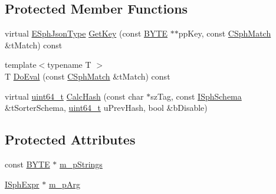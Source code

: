 \subsection*{Protected Member Functions}
\begin{DoxyCompactItemize}
\item 
virtual \hyperlink{sphinxjson_8h_ad0338b1aabded682906629a3e477a2a8}{E\-Sph\-Json\-Type} \hyperlink{structExpr__JsonFieldConv__c_ab2f14a5bce4409374b08ce107656d44e}{Get\-Key} (const \hyperlink{sphinxstd_8h_a4ae1dab0fb4b072a66584546209e7d58}{B\-Y\-T\-E} $\ast$$\ast$pp\-Key, const \hyperlink{classCSphMatch}{C\-Sph\-Match} \&t\-Match) const 
\item 
{\footnotesize template$<$typename T $>$ }\\T \hyperlink{structExpr__JsonFieldConv__c_a5c546414813f2d778b896fd8fc4fdc89}{Do\-Eval} (const \hyperlink{classCSphMatch}{C\-Sph\-Match} \&t\-Match) const 
\item 
virtual \hyperlink{sphinxstd_8h_aaa5d1cd013383c889537491c3cfd9aad}{uint64\-\_\-t} \hyperlink{structExpr__JsonFieldConv__c_a765c81cb20349ea737254ffdfb545707}{Calc\-Hash} (const char $\ast$sz\-Tag, const \hyperlink{classISphSchema}{I\-Sph\-Schema} \&t\-Sorter\-Schema, \hyperlink{sphinxstd_8h_aaa5d1cd013383c889537491c3cfd9aad}{uint64\-\_\-t} u\-Prev\-Hash, bool \&b\-Disable)
\end{DoxyCompactItemize}
\subsection*{Protected Attributes}
\begin{DoxyCompactItemize}
\item 
const \hyperlink{sphinxstd_8h_a4ae1dab0fb4b072a66584546209e7d58}{B\-Y\-T\-E} $\ast$ \hyperlink{structExpr__JsonFieldConv__c_a64669149245655ddcddfcdbed8be059a}{m\-\_\-p\-Strings}
\item 
\hyperlink{structISphExpr}{I\-Sph\-Expr} $\ast$ \hyperlink{structExpr__JsonFieldConv__c_a5dc26c191422d2e20d37cc34ebee060e}{m\-\_\-p\-Arg}
\end{DoxyCompactItemize}


